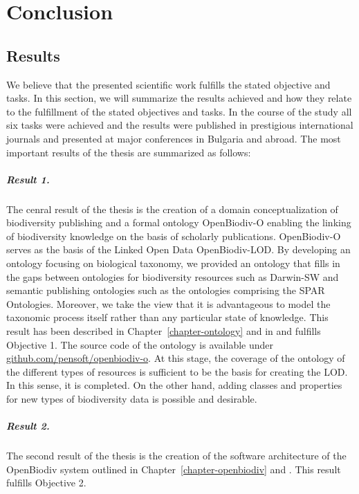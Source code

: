 \chapter*{Conclusion}
\label{chapter:summary}

\section*{Results}

We believe that the presented scientific work fulfills the stated objective and tasks. In this section, we will summarize the results achieved and how they relate to the fulfillment of the stated objectives and tasks. In the course of the study all six tasks were achieved and the results were published in prestigious international journals and presented at major conferences in Bulgaria and abroad. The most important results of the thesis are summarized as follows:

\paragraph{Result 1.} The cenral result of the thesis is the creation of a domain conceptualization of biodiversity publishing and a formal ontology OpenBiodiv-O enabling the linking of biodiversity knowledge on the basis of scholarly publications. OpenBiodiv-O serves as the basis of the Linked Open Data OpenBiodiv-LOD. By developing an ontology focusing on biological taxonomy, we provided an ontology that fills in the gaps between ontologies for biodiversity resources such as Darwin-SW and semantic publishing ontologies such as the ontologies comprising the SPAR Ontologies. Moreover, we take the view that it is advantageous to model the taxonomic process itself rather than any particular state of knowledge. This result has been described in Chapter~\ref{chapter-ontology} and in \cite{senderov_openbiodiv-o:_2018} and fulfills Objective 1. The source code of the ontology is available under \href{https://github.com/pensoft/openbiodiv-o}{github.com/pensoft/openbiodiv-o}. At this stage, the coverage of the ontology of the different types of resources is sufficient to be the basis for creating the LOD. In this sense, it is completed. On the other hand, adding classes and properties for new types of biodiversity data is possible and desirable.

\paragraph{Result 2.} The second result of the thesis is the creation of the software architecture of the OpenBiodiv system outlined in Chapter~\ref{chapter-openbiodiv} and \cite{senderov_open_2016}. This result fulfills Objective 2.

